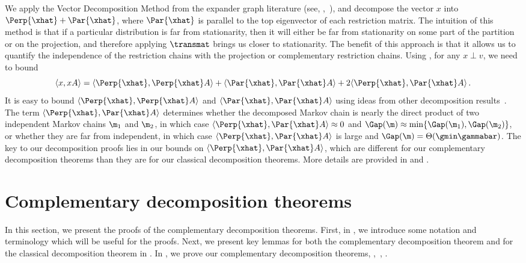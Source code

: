\documentclass{toc}
\begin{document}
We apply the Vector Decomposition Method from the expander graph 
literature (see, \eg,~\cite{RVW, expander-book}), and decompose the 
vector $x$ into $\Perp{\xhat}+\Par{\xhat}$, where $\Par{\xhat}$ is 
parallel to the top eigenvector of each restriction matrix.  The 
intuition of this method is that if a particular distribution is far 
from stationarity, then it will either be far from stationarity on some 
part of the partition or on the projection, and therefore applying 
$\transmat$ brings us closer to stationarity. The benefit of this 
approach is that it allows us to quantify the independence of the 
restriction chains with the projection or complementary restriction chains.
Using 
, for any $x\perp v$, we need to bound 
\begin{equation}\label{eq:split}
\langle x, xA\rangle = \langle \Perp{\xhat},\Perp{\xhat}A\rangle + 
\langle\Par{\xhat},\Par{\xhat}A\rangle + 2\langle \Perp{\xhat},\Par{\xhat}A\rangle\,.
\end{equation}
It is easy to bound $\langle \Perp{\xhat},\Perp{\xhat}A\rangle$ and 
$\langle\Par{\xhat},\Par{\xhat}A\rangle$ using ideas from other 
decomposition results~\cite{jstv04, MR00}. The term $\langle 
\Perp{\xhat},\Par{\xhat}A\rangle$ determines whether the decomposed 
Markov chain is nearly the direct product of two independent Markov 
chains $\m_1$ and $\m_2$, in which case $\langle 
\Perp{\xhat},\Par{\xhat}A\rangle\approx0$ and $\Gap(\m)\approx 
\min\{\Gap(\m_1),\Gap(\m_2)\}$, or whether they are far from 
independent, in which case $\langle \Perp{\xhat},\Par{\xhat}A\rangle$ 
is large and $\Gap(\m)=\Theta(\gmin \gammabar)$.  The key to our 
decomposition proofs lies in our bounds on $\langle 
\Perp{\xhat},\Par{\xhat}A\rangle$, which are different for our 
complementary decomposition theorems than they are for our classical 
decomposition theorems.   More details are provided in  and .

\section{Complementary decomposition theorems}\label{sec:decompProofs} 


In this section, we present the proofs of the complementary 
decomposition theorems.  First, in , we 
introduce some notation and terminology which will be useful for the 
proofs.  Next, we present key lemmas for both the complementary 
decomposition theorem and for the classical decomposition theorem in 
. In , we prove our 
complementary decomposition theorems, 
,~, 
.  
\end{document}
